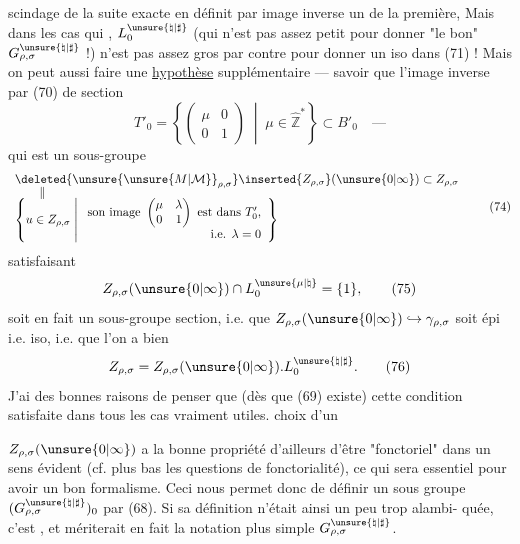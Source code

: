 scindage de la  suite exacte en définit par
image inverse un de la première, 
Mais dans les cas  qui ,
$L_0^{\unsure{\natural|\sharp}}$ (qui n'est pas assez petit pour donner
"le bon"  $G_{\rho,\sigma}^{\unsure{\natural|\sharp}}$ !)
n'est pas assez gros par contre pour donner un iso dans (71) !
Mais  on peut aussi faire une
\uline{hypothèse} supplémentaire --- savoir que l'image inverse par (70)
de  section
\[
T'_0=\left\{
\begin{pmatrix}\mu&0\\0&1\end{pmatrix}
\;\middle|\;\mu\in\widehat{\mathbb Z}^*
\right\}\subset B'_0
\quad\text{---}
\tag{73}
\]
qui est un sous-groupe
\[
\begin{array}{l}
\deleted{\unsure{\unsure{M|\mathcal{M}}}_{\rho,\sigma}}\inserted{Z_{\rho,\sigma}}
(\unsure{0|\infty})\subset Z_{\rho,\sigma}\\[-2pt]
\qquad\Vert\\[-2pt]
\left\{
u\in Z_{\rho,\sigma}\;\middle|\;
\begin{array}{l}
\text{son image }
\begin{pmatrix}\mu&\lambda\\0&1\end{pmatrix}
\text{ est dans }T'_0,\\
\hfill\text{i.e. }\lambda=0
\end{array}
\right\}
\end{array}
\tag{74}
\]
satisfaisant
\[
Z_{\rho,\sigma}(\unsure{0|\infty})\cap L_0^{\unsure{\mu|\natural}}
=\{1\},
\tag{75}
\]
soit en fait un sous-groupe section,
i.e. que $Z_{\rho,\sigma}(\unsure{0|\infty})\hookrightarrow\gamma_{\rho,\sigma}$
soit épi i.e. iso, i.e. que l'on a bien
\[
Z_{\rho,\sigma}
=Z_{\rho,\sigma}(\unsure{0|\infty}).L_0^{\unsure{\natural|\sharp}}.
\tag{76}
\]
J'ai des bonnes raisons de penser que (dès que (69) existe)
cette condition  satisfaite dans tous les cas vraiment utiles.
 choix d'un



$Z_{\rho,\sigma}(\unsure{0|\infty})$ a la bonne propriété d'ailleurs d'être
"fonctoriel" dans un sens évident (cf. plus bas les questions de fonctorialité),
ce qui sera essentiel pour avoir un bon formalisme. Ceci nous permet donc
de définir un sous groupe
$(G_{\rho,\sigma}^{\unsure{\natural|\sharp}})_0$
par (68). Si sa définition n'était ainsi un peu trop alambi-\linebreak
quée, c'est
,
et mériterait en fait la notation plus simple
$G_{\rho,\sigma}^{\unsure{\natural|\sharp}}$.

